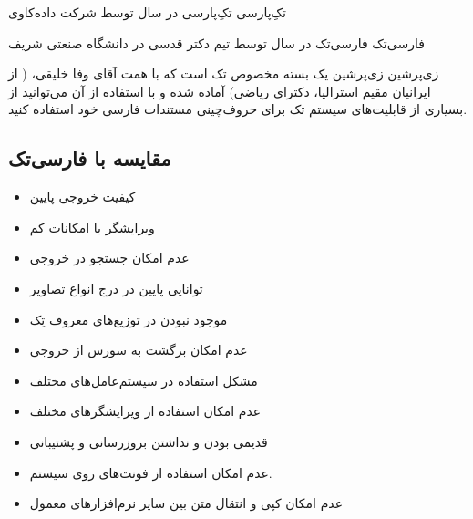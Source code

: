 %
\label{Sec:Compare}
%
\begin{plainslide}
\begin{block}{تکِ‌پارسی}
تکِ‌پارسی در سال  توسط شرکت داده‌کاوی
\end{block}

\begin{block}{فارسی‌تک}
فارسی‌تک در سال  توسط تیم دکتر قدسی در دانشگاه صنعتی شریف
\end{block}


\begin{block}{زی‌پرشین }
زی‌پرشین یک بسته مخصوص تک است که با همت آقای وفا خلیقی، ( از ایرانیان مقیم استرالیا، دکترای ریاضی) آماده شده و با استفاده از آن می‌توانید از بسیاری از قابلیت‌های سیستم تک برای حروف‌چینی مستندات فارسی خود استفاده کنید. 
\end{block}

\end{plainslide}
%
%
\subsection{مقایسه با فارسی‌تک}
\begin{plainslide}
\begin{itemize}%
\item{کیفیت خروجی پایین}
\item{ویرایشگر با امکانات کم}
\item{عدم امکان جستجو در خروجی}
\item{توانایی پایین در درج انواع تصاویر}
\item{موجود نبودن در توزیع‌های معروف تِک}
\item{عدم امکان برگشت به سورس از خروجی}
\item{مشکل استفاده در سیستم‌عامل‌های مختلف}
\item{عدم امکان استفاده از ویرایشگرهای مختلف}
\item{قدیمی بودن و نداشتن بروزرسانی و پشتیبانی}
\item{عدم امکان استفاده از فونت‌های روی سیستم.}
\item{عدم امکان کپی و انتقال متن بین سایر نرم‌افزارهای معمول}

\end{itemize}
\end{plainslide}
%
